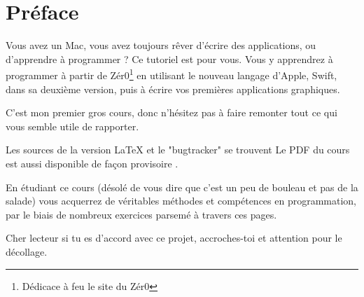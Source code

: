 \chapter*{Préface}
{}
Vous avez un Mac, vous avez toujours rêver d'écrire des applications, ou d'apprendre à programmer ?
Ce tutoriel est pour vous.
Vous y apprendrez à programmer à partir de  Zér0\footnote{Dédicace à feu le site du Zér0} 
en utilisant le nouveau langage d'Apple, Swift, dans sa deuxième version, puis à écrire vos premières applications graphiques.

C'est mon premier gros cours, donc n'hésitez pas à faire remonter tout ce qui vous semble utile de rapporter.

Les sources de la version LaTeX et le "bugtracker" se trouvent 
Le PDF du cours est aussi disponible de façon provisoire .

En étudiant ce cours
(désolé de vous dire que c'est un peu de bouleau et pas de la salade)
vous acquerrez de véritables méthodes et compétences en programmation,
par le biais de nombreux exercices parsemé à travers ces pages.

Cher lecteur si tu es d'accord avec ce projet, accroches-toi et attention pour le décollage.
